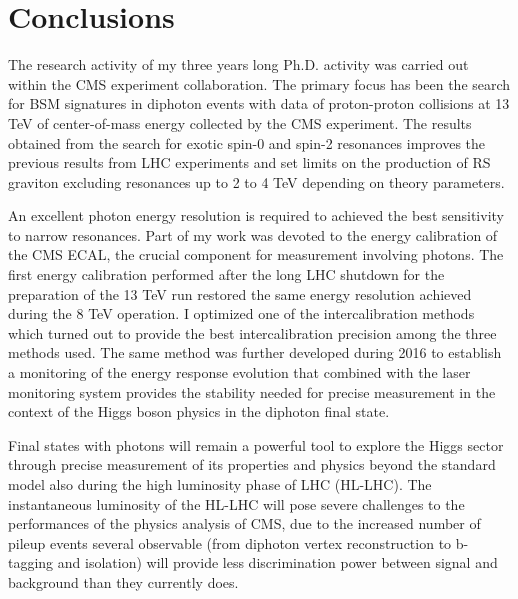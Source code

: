 \chapter{Conclusions}
\label{chapter:conclusions}

The research activity of my three years long Ph.D. activity was carried out within the
CMS experiment collaboration. The primary focus has been the search for BSM signatures in
diphoton events with data of proton-proton collisions at 13 TeV of center-of-mass energy collected by the CMS experiment.
The results obtained from the search for exotic spin-0 and spin-2 resonances improves the previous results
from LHC experiments and set limits on the production of RS graviton excluding resonances up to 2 to 4 TeV depending
on theory parameters.

An excellent photon energy resolution is required to achieved the best sensitivity to narrow resonances. Part
of my work was devoted to the energy calibration of the CMS ECAL, the crucial component for measurement involving
photons. The first energy calibration performed after the long LHC shutdown for the preparation of the 13 TeV run
restored the same energy resolution achieved during the 8 TeV operation. I optimized one of the
intercalibration methods which turned out to provide the best intercalibration precision among
the three methods used. The same method was further developed during 2016 to establish a monitoring of
the energy response evolution that combined with the laser monitoring system provides the stability needed
for precise measurement in the context of the Higgs boson physics in the diphoton final state.

Final states with photons will remain a powerful tool to explore the Higgs sector through precise
measurement of its properties and physics beyond the standard model also during the high luminosity phase
of LHC (HL-LHC). The instantaneous luminosity of the HL-LHC will pose severe challenges to the performances of
the physics analysis of CMS, due to the increased number of pileup events several observable (from diphoton
vertex reconstruction to b-tagging and isolation) will provide less discrimination power between signal
and background than they currently does.

